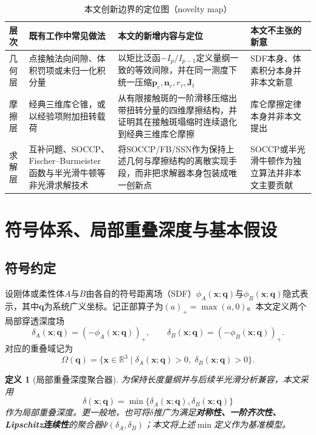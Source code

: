 ﻿\documentclass[12pt, a4paper]{ctexart}
\theoremstyle{plain}
\newtheorem{definition}{定义}
\theoremstyle{remark}
\begin{document}
\begin{table}[htbp]
    \centering
    \caption{本文创新边界的定位图（novelty map）}
    \label{tab:novelty_map}
    \footnotesize
    \setlength{\tabcolsep}{4pt}
    \renewcommand{\arraystretch}{1.15}
    \begin{tabular}{p{1.9cm}p{3.9cm}p{5.0cm}p{3.7cm}}
        \toprule
        层次 & 既有工作中常见做法 & 本文的新增内容与定位 & 本文不主张的新意 \\
        \midrule
        几何层 & 点接触法向间隙、体积罚项或未归一化积分量 & 以矩比泛函$-I_p/I_{p-1}$定义量纲一致的等效间隙，并在同一测度下统一压缩$\bm{p}_c,\bm{n}_c,r_\tau,\bm{J}_t$ & SDF本身、体素积分本身并非本文新意 \\
        摩擦层 & 经典三维库仑锥，或以经验项附加扭转载荷 & 从有限接触斑的一阶滑移压缩出带扭转分量的四维摩擦结构，并证明其在接触斑塌缩时连续退化到经典三维库仑摩擦 & 库仑摩擦定律本身并非本文提出 \\
        求解层 & 互补问题、SOCCP、Fischer--Burmeister函数与半光滑牛顿等非光滑求解技术 & 将SOCCP/FB/SSN作为保持上述几何与摩擦结构的离散实现手段，而非把求解器本身包装成唯一创新点 & SOCCP或半光滑牛顿作为独立算法并非本文主要贡献 \\
        \bottomrule
    \end{tabular}
\end{table}

\section{符号体系、局部重叠深度与基本假设}
\subsection{符号约定}
设刚体或柔性体$A$与$B$由各自的符号距离场（SDF）$\phi_A(\bm{x};\bm{q})$与$\phi_B(\bm{x};\bm{q})$隐式表示，其中$\bm{q}$为系统广义坐标。记正部算子为$(a)_+ = \max(a,0)$。本文定义两个局部穿透深度场
\begin{equation}
    \delta_A(\bm{x};\bm{q}) = (-\phi_A(\bm{x};\bm{q}))_+, \qquad
    \delta_B(\bm{x};\bm{q}) = (-\phi_B(\bm{x};\bm{q}))_+ .
\end{equation}
对应的重叠域记为
\begin{equation}
    \Omega(\bm{q}) = \{ \bm{x} \in \mathbb{R}^3 \mid \delta_A(\bm{x};\bm{q}) > 0,\; \delta_B(\bm{x};\bm{q}) > 0 \} .
\end{equation}

\begin{definition}[局部重叠深度聚合器]
为保持长度量纲并与后续半光滑分析兼容，本文采用
\begin{equation}
    \delta(\bm{x};\bm{q}) = \min\{ \delta_A(\bm{x};\bm{q}), \delta_B(\bm{x};\bm{q}) \}
\end{equation}
作为局部重叠深度。更一般地，也可将$\delta$推广为满足\textbf{对称性、一阶齐次性、Lipschitz连续性}的聚合器$\Psi(\delta_A,\delta_B)$；本文将上述$\min$定义作为基准模型。
\end{definition}
\end{document}
